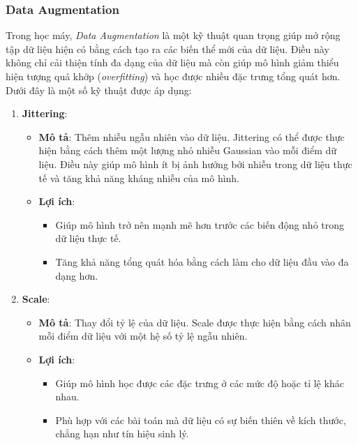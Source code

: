 \subsubsection{Data Augmentation}

Trong học máy, \textit{Data Augmentation} là một kỹ thuật quan trọng giúp mở rộng tập dữ liệu hiện có bằng cách tạo ra các biến thể mới của dữ liệu. Điều này không chỉ cải thiện tính đa dạng của dữ liệu mà còn giúp mô hình giảm thiểu hiện tượng quá khớp (\textit{overfitting}) và học được nhiều đặc trưng tổng quát hơn. Dưới đây là một số kỹ thuật được áp dụng:

\begin{enumerate}

\item \textbf{Jittering}: 
\begin{itemize}
\item \textbf{Mô tả}: Thêm nhiễu ngẫu nhiên vào dữ liệu. Jittering có thể được thực hiện bằng cách thêm một lượng nhỏ nhiễu Gaussian vào mỗi điểm dữ liệu. Điều này giúp mô hình ít bị ảnh hưởng bởi nhiễu trong dữ liệu thực tế và tăng khả năng kháng nhiễu của mô hình.
\item \textbf{Lợi ích}: 
\begin{itemize}
\item Giúp mô hình trở nên mạnh mẽ hơn trước các biến động nhỏ trong dữ liệu thực tế.
\item Tăng khả năng tổng quát hóa bằng cách làm cho dữ liệu đầu vào đa dạng hơn.
\end{itemize}
\end{itemize}

\item \textbf{Scale}: 
\begin{itemize}
\item \textbf{Mô tả}: Thay đổi tỷ lệ của dữ liệu. Scale được thực hiện bằng cách nhân mỗi điểm dữ liệu với một hệ số tỷ lệ ngẫu nhiên.
 \item \textbf{Lợi ích}:
\begin{itemize}
\item Giúp mô hình học được các đặc trưng ở các mức độ hoặc tỉ lệ khác nhau.
 \item Phù hợp với các bài toán mà dữ liệu có sự biến thiên về kích thước, chẳng hạn như tín hiệu sinh lý.
\end{itemize}
 \end{itemize}


\end{enumerate}
